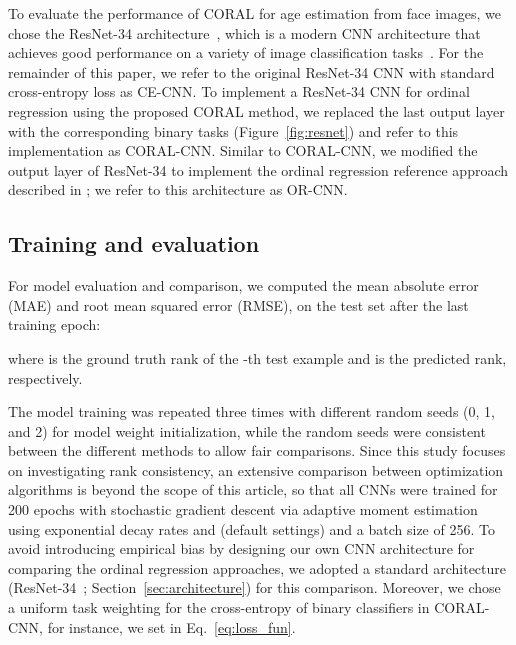 \documentclass[times,twocolumn,final,authoryear]{elsarticle}
\begin{document}
To evaluate the performance of CORAL for age estimation from face images, we chose the ResNet-34 architecture~\citep{he2016deep}, which is a modern CNN architecture that achieves good performance on a variety of image classification tasks~\citep{goceri2019analysis}. For the remainder of this paper, we refer to the original ResNet-34 CNN with standard cross-entropy loss as {CE-CNN}. To implement a ResNet-34 CNN for ordinal regression using the proposed CORAL method, we replaced the last output layer with the corresponding binary tasks (Figure~\ref{fig:resnet}) and refer to this implementation as {CORAL-CNN}. Similar to {CORAL-CNN}, we modified the output layer of ResNet-34 to implement the ordinal regression reference approach described in \citep{niu2016ordinal}; we refer to this architecture as {OR-CNN}.




\subsection{Training and evaluation}


For model evaluation and comparison, we computed the mean absolute error (MAE) and root mean squared error (RMSE), on the test set after the last training epoch:


where  is the ground truth rank of the -th test example and  is the predicted rank, respectively. 
 
The model training was repeated three times with different random seeds (0, 1, and 2) for model weight initialization, while the random seeds were consistent between the different methods to allow fair comparisons. Since this study focuses on investigating rank consistency, an extensive comparison between optimization algorithms is beyond the scope of this article, so that all CNNs were trained for 200 epochs with stochastic gradient descent via adaptive moment estimation~\citep{kingma2015adam}  using exponential decay rates  and  (default settings) and a batch size of 256. To avoid introducing empirical bias by designing our own CNN architecture for comparing the ordinal regression approaches, we adopted a standard architecture (ResNet-34~\citep{he2016deep};  Section~\ref{sec:architecture}) for this comparison. Moreover, we chose a uniform task weighting for the cross-entropy of  binary classifiers in CORAL-CNN, for instance, we set  in Eq.~\ref{eq:loss_fun}.
\end{document}
